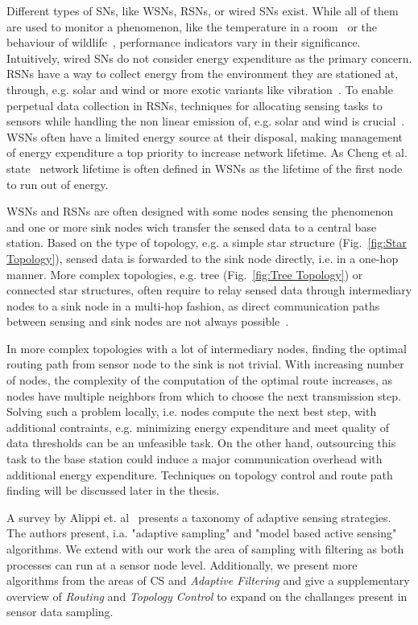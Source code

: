 Different types of \acp{SN}, like \acp{WSN}, \acp{RSN}, or wired \acp{SN}
exist. While all of them are used to monitor a phenomenon, like the temperature
in a room~\cite{labdata} or the behaviour of
wildlife~\cite{bennett2011cranetracker}, performance indicators vary in their
significance. Intuitively, wired \acp{SN} do not consider energy expenditure as
the primary concern. \acp{RSN} have a way to collect energy from the
environment they are stationed at, through, e.g. solar and wind or more exotic
variants like vibration~\cite{perpetuum}. To enable perpetual data collection
in \acp{RSN}, techniques for allocating sensing tasks to sensors while handling
the non linear emission of, e.g. solar and wind is
crucial~\cite{liu2011perpetual}. \acp{WSN} often have a limited energy source
at their disposal, making management of energy expenditure a top priority to
increase network lifetime. As Cheng et al. state~\cite{cheng2013stcdg} network
lifetime is often defined in \acp{WSN} as the lifetime of the first node to run
out of energy. 
\par
\acp{WSN} and \acp{RSN} are often designed with some nodes sensing the
phenomenon and one or more sink nodes wich transfer the sensed data to a
central base station. Based on the type of topology, e.g. a simple star
structure (Fig.~\ref{fig:Star Topology}), sensed data is forwarded to the sink
node directly, i.e. in a one-hop manner. More complex topologies, e.g. tree
(Fig.~\ref{fig:Tree Topology}) or connected star structures, often require to
relay sensed data through intermediary nodes to a sink node in a multi-hop
fashion, as direct communication paths between sensing and sink nodes are not
always possible~\cite{romer2004design}. 
\par
In more complex topologies with a lot of intermediary nodes, finding the
optimal routing path from sensor node to the sink is not trivial. With
increasing number of nodes, the complexity of the computation of the optimal
route increases, as nodes have multiple neighbors from which to choose the next
transmission step. Solving such a problem locally, i.e. nodes compute the next
best step, with additional contraints, e.g. minimizing energy expenditure and
meet quality of data thresholds can be an unfeasible task. On the other hand,
outsourcing this task to the base station could induce a major communication
overhead with additional energy expenditure. Techniques on topology control
and route path finding will be discussed later in the thesis.
\par
A survey by Alippi et. al~\cite{alippi2009energy} presents a taxonomy of
adaptive sensing strategies. The authors present, i.a. "adaptive sampling" and
"model based active sensing" algorithms. We extend with our work the area of
sampling with filtering as both processes can run at a sensor node level.
Additionally, we present more algorithms from the areas of \ac{CS} and
\textit{Adaptive Filtering} and give a supplementary overview of
\textit{Routing} and \textit{Topology Control} to expand on the challanges
present in sensor data sampling.

